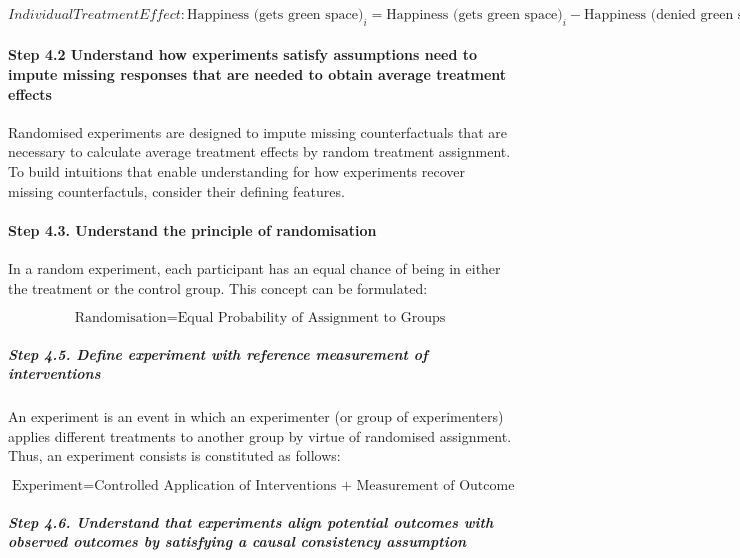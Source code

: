 \documentclass[
  singlecolumn]{article}
\let\oldparagraph\paragraph
\renewcommand{\paragraph}[1]{\oldparagraph{#1}\mbox{}}
\let\oldsubparagraph\subparagraph
\renewcommand{\subparagraph}[1]{\oldsubparagraph{#1}\mbox{}}
\begin{document}
\[
Individual Treatment Effect: \text{Happiness (gets green space)}_{i} = \text{Happiness (gets green space)}_i - \text{Happiness (denied green space)}_i
\]

\paragraph{Step 4.2 Understand how experiments satisfy assumptions need
to impute missing responses that are needed to obtain average treatment
effects}\label{step-4.2-understand-how-experiments-satisfy-assumptions-need-to-impute-missing-responses-that-are-needed-to-obtain-average-treatment-effects}

Randomised experiments are designed to impute missing counterfactuals
that are necessary to calculate average treatment effects by random
treatment assignment. To build intuitions that enable understanding for
how experiments recover missing counterfactuls, consider their defining
features.

\paragraph{\texorpdfstring{\textbf{Step 4.3. Understand the principle of
randomisation}}{Step 4.3. Understand the principle of randomisation}}\label{step-4.3.-understand-the-principle-of-randomisation}

In a random experiment, each participant has an equal chance of being in
either the treatment or the control group. This concept can be
formulated:

\[
\text{Randomisation} = \text{Equal Probability of Assignment to Groups}
\]

\subparagraph{\texorpdfstring{\textbf{Step 4.5. Define experiment with
reference measurement of
interventions}}{Step 4.5. Define experiment with reference measurement of interventions}}\label{step-4.5.-define-experiment-with-reference-measurement-of-interventions}

An experiment is an event in which an experimenter (or group of
experimenters) applies different treatments to another group by virtue
of randomised assignment. Thus, an experiment consists is constituted as
follows:

\[
\text{Experiment} = \text{Controlled Application of Interventions + Measurement of Outcome}
\]

\subparagraph{\texorpdfstring{\textbf{Step 4.6. Understand that
experiments align potential outcomes with observed outcomes by
satisfying a causal consistency
assumption}}{Step 4.6. Understand that experiments align potential outcomes with observed outcomes by satisfying a causal consistency assumption}}\label{step-4.6.-understand-that-experiments-align-potential-outcomes-with-observed-outcomes-by-satisfying-a-causal-consistency-assumption}
\end{document}

